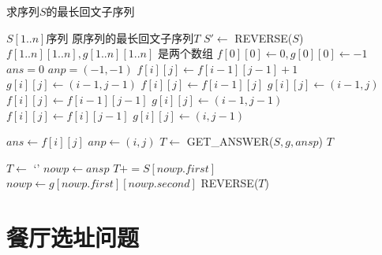 \documentclass[UTF8]{ctexart}
\begin{document}
    \begin{algorithm}
        \caption{求序列$S$的最长回文子序列}
        \begin{algorithmic}[1]
            \Require $S[1..n]$序列
            \Ensure 原序列的最长回文子序列$T$
                \State $S' \gets$ REVERSE($S$)
                \State $f[1..n][1..n], g[1..n][1..n]$ 是两个数组
                \State $f[0][0] \gets 0, g[0][0] \gets -1$
                \State $ans = 0$
                \State $anp = (-1, -1)$
                            \State $f[i][j] \gets f[i-1][j-1] + 1$
                            \State $g[i][j] \gets (i-1, j-1)$
                            \State $f[i][j] \gets f[i-1][j]$
                            \State $g[i][j] \gets (i-1, j)$
                            \State $f[i][j] \gets f[i-1][j-1]$
                            \State $g[i][j] \gets (i-1, j-1)$
                            \State $f[i][j] \gets f[i][j-1]$
                            \State $g[i][j] \gets (i, j-1)$
                        \EndIf

                            \State $ans \gets f[i][j]$
                            \State $anp \gets (i, j)$
                        \EndIf
                    \EndFor
                \EndFor
                \State $T \gets$ GET\_ANSWER($S, g, ansp$)
                \State \Return $T$
            \EndFunction
    
                \State $T \gets$ `'
                \State $nowp \gets ansp$
                    \State $T += S[nowp.first]$
                    \State $nowp \gets g[nowp.first][nowp.second]$
                \EndWhile
                \State \Return REVERSE($T$)
            \EndFunction
        \end{algorithmic}
        \label{algo1}
    \end{algorithm}

\section{餐厅选址问题} %
\end{document}
